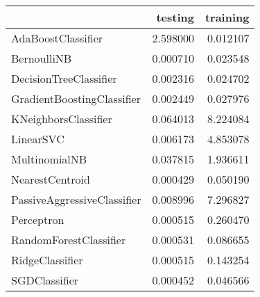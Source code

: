 \begin{tabular}{lrr}
\toprule
{} &   testing &  training \\
\midrule
AdaBoostClassifier          &  2.598000 &  0.012107 \\
BernoulliNB                 &  0.000710 &  0.023548 \\
DecisionTreeClassifier      &  0.002316 &  0.024702 \\
GradientBoostingClassifier  &  0.002449 &  0.027976 \\
KNeighborsClassifier        &  0.064013 &  8.224084 \\
LinearSVC                   &  0.006173 &  4.853078 \\
MultinomialNB               &  0.037815 &  1.936611 \\
NearestCentroid             &  0.000429 &  0.050190 \\
PassiveAggressiveClassifier &  0.008996 &  7.296827 \\
Perceptron                  &  0.000515 &  0.260470 \\
RandomForestClassifier      &  0.000531 &  0.086655 \\
RidgeClassifier             &  0.000515 &  0.143254 \\
SGDClassifier               &  0.000452 &  0.046566 \\
\bottomrule
\end{tabular}
